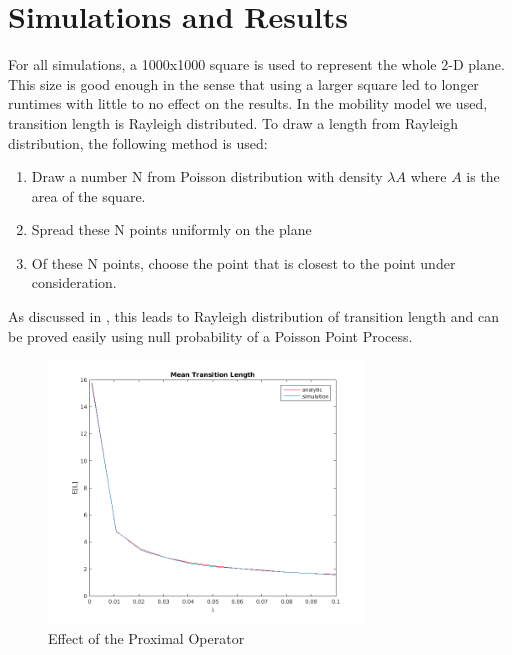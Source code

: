 \chapter{Simulations and Results}
For all simulations, a 1000x1000 square is used to represent the whole 2-D plane. This size is good enough in the sense that using a larger square led to longer runtimes with little to no 
effect on the results. In the mobility model we used, transition length is Rayleigh distributed. To draw a length from Rayleigh distribution, the following method is used:

\begin{enumerate}
	\item Draw a number N from Poisson distribution with density $\lambda A$ where $A$ is the area of the square.
	\item Spread these N points uniformly on the plane
	\item Of these N points, choose the point that is closest to the point under consideration. 
\end{enumerate}

As discussed in \cite{ganti}, this leads to Rayleigh distribution of transition length and can be proved easily using null probability of a Poisson Point Process. 
\begin{figure}[h]
	\centering \vspace{-0.1in}
	\includegraphics[width=0.75\textwidth]{images/rwpStat.png}
	\vspace{-20pt} \caption[Effect of the proximal Operator]{\small Effect of the Proximal Operator }
	\label{fig:rwpEL}
\end{figure}


